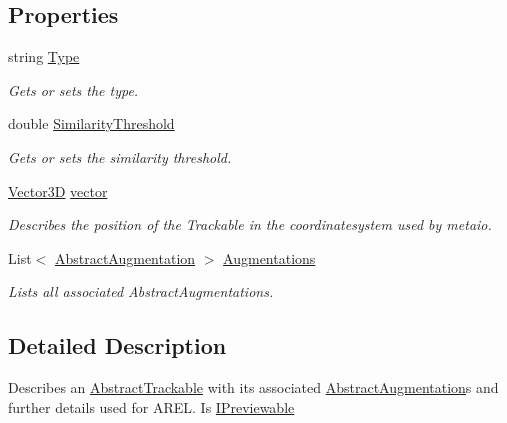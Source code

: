 \subsection*{Properties}
\begin{DoxyCompactItemize}
\item 
string \hyperlink{class_a_rdev_kit_1_1_model_1_1_project_1_1_abstract_trackable_ab55c05790e5ffbefc7351a91167427bc}{Type}
\begin{DoxyCompactList}\small\item\em Gets or sets the type. \end{DoxyCompactList}\item 
double \hyperlink{class_a_rdev_kit_1_1_model_1_1_project_1_1_abstract_trackable_af77b1f7a449ef9150e22c684894213b1}{Similarity\-Threshold}
\begin{DoxyCompactList}\small\item\em Gets or sets the similarity threshold. \end{DoxyCompactList}\item 
\hyperlink{class_a_rdev_kit_1_1_model_1_1_project_1_1_vector3_d}{Vector3\-D} \hyperlink{class_a_rdev_kit_1_1_model_1_1_project_1_1_abstract_trackable_a1a8b6d43d95fad1720fc5af98b7e42b4}{vector}
\begin{DoxyCompactList}\small\item\em Describes the position of the Trackable in the coordinatesystem used by metaio. \end{DoxyCompactList}\item 
List$<$ \hyperlink{class_a_rdev_kit_1_1_model_1_1_project_1_1_abstract_augmentation}{Abstract\-Augmentation} $>$ \hyperlink{class_a_rdev_kit_1_1_model_1_1_project_1_1_abstract_trackable_a999faeee63dee9445e8617d539c5b8d9}{Augmentations}
\begin{DoxyCompactList}\small\item\em Lists all associated Abstract\-Augmentations. \end{DoxyCompactList}\end{DoxyCompactItemize}


\subsection{Detailed Description}
Describes an \hyperlink{class_a_rdev_kit_1_1_model_1_1_project_1_1_abstract_trackable}{Abstract\-Trackable} with its associated \hyperlink{class_a_rdev_kit_1_1_model_1_1_project_1_1_abstract_augmentation}{Abstract\-Augmentation}s and further details used for A\-R\-E\-L. Is \hyperlink{interface_a_rdev_kit_1_1_model_1_1_project_1_1_i_previewable}{I\-Previewable} 



